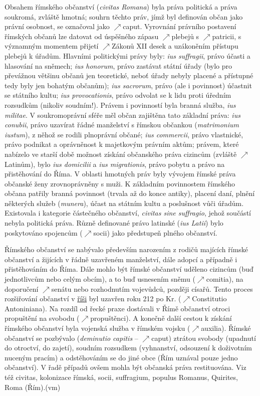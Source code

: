 \documentclass{article}
\begin{document}
  Obsahem římského občanství ({\it civitas Romana}) byla práva politická a práva soukromá, zvláště hmotná; souhrn těchto práv, jímž byl definován občan jako právní osobnost, se označoval jako $\nearrow$caput. Vyrovnání právního postavení římských občanů lze datovat od úspěšného zápasu $\nearrow$plebejů s $\nearrow$patricii, s významným momentem přijetí $\nearrow$Zákonů XII desek a uzákoněním přístupu plebejů k úřadům. Hlavními  politickými právy byly: {\it ius suffragii}, právo účasti a hlasování na sněmech; {\it ius honorum}, právo zastávat státní úřady (bylo pro převážnou většinu občanů jen teoretické, neboť úřady nebyly placené a přístupné tedy byly jen bohatým občanům); {\it ius sacrorum}, právo (ale i povinnost) účastnit se státního kultu; {\it ius provocationis}, právo odvolat se k lidu proti úředním rozsudkům (nikoliv soudním!). Právem i povinností byla branná služba, {\it ius militae}. V soukromoprávní sféře měl občan zajištěna tato základní práva: {\it ius conubii}, právo uzavírat řádné manželství s římskou občankou ({\it matrimonium iustum}), z něhož se rodili plnoprávní občané; {\it ius commercii}, právo vlastnické, právo podnikat a oprávněnost k majetkovým právním aktům; právem, které nabízelo ve starší době možnost získání občanského práva cizincům (zvláště $\nearrow$Latinům), bylo {\it ius domicilii} a {\it ius migrationis}, právo  pobytu a právo na přistěhování do Říma. V oblasti hmotných práv byly vývojem římské práva občanské ženy zrovnoprávněny s muži. K základním povinnostem římského občana patřily branná povinnost (trvala až do konce antiky), placení daní, plnění některých služeb ({\it munera}), účast na státním kultu a poslušnost vůči úřadům. Existovala i kategorie částečného občanství, {\it civitas sine suffragio}, jehož součástí nebyla politická práva. Různě definované právo latinské ({\it ius Latii}) bylo poskytováno spojencům ($\nearrow$socii) jako předstupeň plného občanství.

  Římského občanství se nabývalo především narozením z rodičů majících římské občanství a žijících v řádně uzavřeném manželství, dále adopcí a případně i přistěhováním do Říma. Dále mohlo být římské občanství uděleno cizincům (buď jednotlivcům nebo celým obcím), a to buď usnesením sněmu ($\nearrow$comitia), na doporučení $\nearrow$senátu nebo rozhodnutím vojevůdců, později císařů. Tento proces rozšiřování občanství v \hyperref[sec:rise]{říši} byl uzavřen roku 212 po Kr. ($\nearrow$Constitutio Antoniniana). Na rozdíl od řecké praxe dostávali v Římě občanství otroci propuštění na svobodu ($\nearrow$propuštěnci). A konečně další cestou k získání římského občanství byla vojenská služba v římském vojsku ($\nearrow$auxilia). Římské občanství se pozbývalo ({\it deminutio capitis} -- $\nearrow$caput) ztrátou svobody (upadnutí do otroctví, do zajetí), soudním rozsudkem (vyhnanství, odsouzení k doživotním nuceným pracím) a odstěhováním se do jiné obce (Řím uznával pouze jedno občanství). V řadě případů ovšem mohla být občanská práva restituována. Viz též civitas, kolonizace římská, socii, suffragium, populus Romanus, Quirites, Roma (Řím).\hfill (vm)
\end{document}
